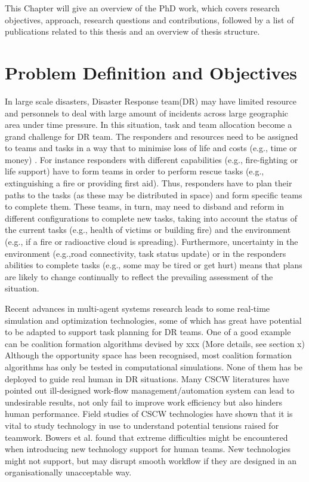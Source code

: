This Chapter will give an overview of the PhD work, which covers research objectives, approach, research questions and contributions, followed by a list of publications related to this thesis and an overview of thesis structure.


\section{Problem Definition and Objectives}
In large scale disasters, Disaster Response team(DR) may have limited resource and personnels to deal with large amount of incidents across large geographic area under time pressure. In this situation, task and team allocation become a grand challenge for DR team. The responders and resources need to be assigned to teams and tasks in a way that to minimise loss of life and costs (e.g., time or money) . For instance responders with different capabilities (e.g., fire-fighting or life support) have to form teams in order to perform rescue tasks (e.g., extinguishing a fire or providing first aid). Thus, responders have to plan their paths to the tasks (as these may be distributed in space) and form specific teams to complete them. These teams, in turn, may need to disband and reform in different configurations to complete new tasks, taking into account the status of the current tasks (e.g., health of victims or building fire) and the environment (e.g., if a fire or radioactive cloud is spreading). Furthermore, uncertainty in the environment (e.g.,road connectivity, task status update) or in the responders abilities to complete tasks (e.g., some may be tired or get hurt) means that plans are likely to change continually to reflect the prevailing assessment of the situation.

Recent advances in multi-agent systems research leads to some real-time simulation and optimization technologies, some of which has great have potential to be adapted to support task planning for DR teams. One of a good example can be coalition formation algorithms devised by xxx (More details, see section x) Although the opportunity space has been recognised, most coalition formation algorithms has only be tested in computational simulations. None of them has be deployed to guide real human in DR situations. Many CSCW literatures have pointed out ill-designed work-flow management/automation system can lead to undesirable results, not only fail to improve work efficiency but also hinders human performance. Field studies of CSCW technologies have shown that it is vital to study technology in use to understand potential tensions raised for teamwork. Bowers et al. found that extreme difficulties might be encountered when introducing new technology support for human teams. New technologies might not support, but may disrupt smooth workflow if they are designed in an organisationally unacceptable way. \\


